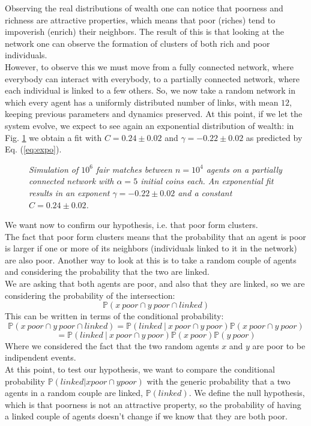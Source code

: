 Observing the real distributions of wealth one can notice that poorness and richness are attractive properties, which means that poor (riches) tend to impoverish (enrich) their neighbors.
The result of this is that looking at the network one can observe the formation of clusters of both rich and poor individuals. \\
However, to observe this we must move from a fully connected network, where everybody can interact with everybody, to a partially connected network, where each individual is linked to a few others.
So, we now take a random network in which every agent has a uniformly distributed number of links, with mean $12$, keeping previous parameters and dynamics preserved.
At this point, if we let the system evolve, we expect to see again an exponential distribution of wealth: in Fig. \ref{fig:fixedExpo} we obtain a fit with $C = 0.24 \pm 0.02$ and $\gamma = -0.22 \pm 0.02$ as predicted by Eq. (\ref{eq:expo}).
\begin{figure}[H]
    \centering
    \scalebox{.7}{}
    \caption{\emph{Simulation of $10^6$ fair matches between $n = 10^4$ agents on a partially connected network with $\alpha = 5$ initial coins each. 
                    An exponential fit results in an exponent $\gamma = -0.22 \pm 0.02$ and a constant $C = 0.24 \pm 0.02$.}}
    \label{fig:fixedExpo}
\end{figure}
We want now to confirm our hypothesis, i.e. that poor form clusters. \\
The fact that poor form clusters means that the probability that an agent is poor is larger if one or more of its neighbors (individuals linked to it in the network) are also poor. Another way to look at this is to take a random couple of agents and considering the probability that the two are linked. \\
We are asking that both agents are poor, and also that they are linked, so we are considering the probability of the intersection:
$$
	\mathbb{P}(x \ poor \cap y \ poor \cap linked)
$$
This can be written in terms of the conditional probability:
$$
	\mathbb{P}(x \ poor \cap y \ poor \cap linked) = \mathbb{P}(linked \ \vert \ x \ poor \cap y \ poor) \mathbb{P}(x \ poor \cap y \ poor) 
$$
$$
	= \mathbb{P}(linked \ \vert \ x \ poor \cap y \ poor) \mathbb{P}(x \ poor)\mathbb{P}(y \ poor) 
$$
Where we considered the fact that the two random agents $x$ and $y$ are poor to be indipendent events. \\
At this point, to test our hypothesis, we want to compare the conditional probability $\mathbb{P}(linked \vert x poor \cap y poor)$ with the generic probability that a two agents in a random couple are linked, $\mathbb{P}(linked)$. We define the null hypothesis, which is that poorness is not an attractive property, so the probability of having a linked couple of agents doesn't change if we know that they are both poor. \\
